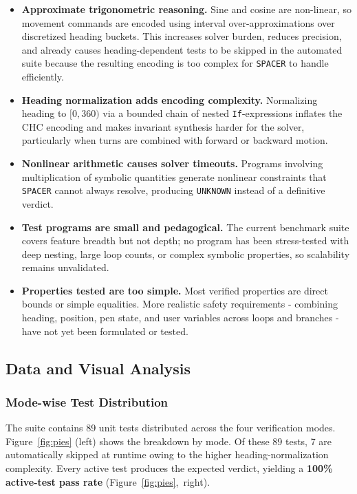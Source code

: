 \begin{itemize}[leftmargin=1.5em]
    \item \textbf{Approximate trigonometric reasoning.} Sine and cosine are non-linear, so movement commands are encoded using interval over-approximations over discretized heading buckets. This increases solver burden, reduces precision, and already causes heading-dependent tests to be skipped in the automated suite because the resulting encoding is too complex for \texttt{SPACER} to handle efficiently.
    \item \textbf{Heading normalization adds encoding complexity.} Normalizing heading to $[0, 360)$ via a bounded chain of nested \texttt{If}-expressions inflates the CHC encoding and makes invariant synthesis harder for the solver, particularly when turns are combined with forward or backward motion.
    \item \textbf{Nonlinear arithmetic causes solver timeouts.} Programs involving multiplication of symbolic quantities generate nonlinear constraints that \texttt{SPACER} cannot always resolve, producing \texttt{UNKNOWN} instead of a definitive verdict.
    \item \textbf{Test programs are small and pedagogical.} The current benchmark suite covers feature breadth but not depth; no program has been stress-tested with deep nesting, large loop counts, or complex symbolic properties, so scalability remains unvalidated.
    \item \textbf{Properties tested are too simple.} Most verified properties are direct bounds or simple equalities. More realistic safety requirements - combining heading, position, pen state, and user variables across loops and branches - have not yet been formulated or tested.
\end{itemize}

\subsection*{Data and Visual Analysis}

\subsubsection*{Mode-wise Test Distribution}

The suite contains 89 unit tests distributed across the four verification modes.
Figure~\ref{fig:pies} (left) shows the breakdown by mode.
Of these 89 tests, 7 are automatically skipped at runtime owing to the
higher heading-normalization complexity. Every active test produces the expected
verdict, yielding a \textbf{100\% active-test pass rate} (Figure~\ref{fig:pies},~right).

